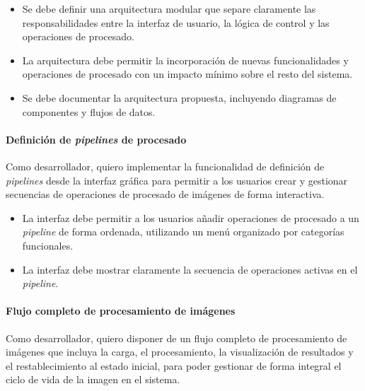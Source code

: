 \begin{itemize}[noitemsep]
	\item Se debe definir una arquitectura modular que separe claramente las responsabilidades entre la interfaz de usuario, la lógica de control y las operaciones de procesado.
	\item La arquitectura debe permitir la incorporación de nuevas funcionalidades y operaciones de procesado con un impacto mínimo sobre el resto del sistema.
	\item Se debe documentar la arquitectura propuesta, incluyendo diagramas de componentes y flujos de datos.
\end{itemize}

\paragraph{Definición de \textit{pipelines} de procesado} \label{hist:definicion_pipelines_procesado}
Como desarrollador, quiero implementar la funcionalidad de definición de \textit{pipelines}
desde la interfaz gráfica para permitir a los usuarios crear y gestionar secuencias de operaciones de procesado de imágenes de forma interactiva.

\begin{itemize}[noitemsep]
	\item La interfaz debe permitir a los usuarios añadir operaciones de procesado a un \textit{pipeline} de forma ordenada, utilizando un menú organizado por categorías funcionales.
	\item La interfaz debe mostrar claramente la secuencia de operaciones activas en el \textit{pipeline}.
\end{itemize}

\newpage

\paragraph{Flujo completo de procesamiento de imágenes} \label{hist:gestion_completa_imagen_cargada}
Como desarrollador, quiero disponer de un flujo completo de procesamiento de imágenes que incluya la carga, 
el procesamiento, la visualización de resultados y el restablecimiento al estado inicial, para poder gestionar 
de forma integral el ciclo de vida de la imagen en el sistema.

